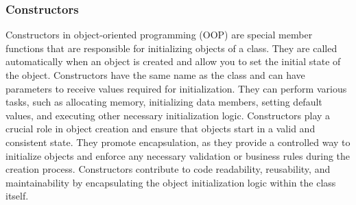 \subsubsection*{Constructors}

Constructors in object-oriented programming (OOP) are special member functions that are responsible for initializing objects of a class. They are called automatically when an object is created and allow you to set the initial 
state of the object. Constructors have the same name as the class and can have parameters to receive values required for initialization. They can perform various tasks, such as allocating memory, initializing data members, 
setting default values, and executing other necessary initialization logic. Constructors play a crucial role in object creation and ensure that objects start in a valid and consistent state. They promote encapsulation, as 
they provide a controlled way to initialize objects and enforce any necessary validation or business rules during the creation process. Constructors contribute to code readability, reusability, and maintainability by encapsulating 
the object initialization logic within the class itself.

